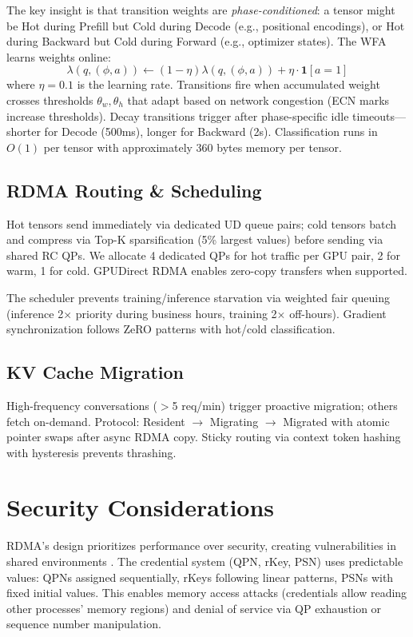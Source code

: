 \documentclass[10pt,letterpaper]{article}
\begin{document}
The key insight is that transition weights are \textit{phase-conditioned}: a tensor might be Hot during Prefill but Cold during Decode (e.g., positional encodings), or Hot during Backward but Cold during Forward (e.g., optimizer states). The WFA learns weights online:
\[
\lambda(q, (\phi, a)) \leftarrow (1-\eta)\lambda(q, (\phi, a)) + \eta \cdot \mathbf{1}[a = 1]
\]
where $\eta = 0.1$ is the learning rate. Transitions fire when accumulated weight crosses thresholds $\theta_w, \theta_h$ that adapt based on network congestion (ECN marks increase thresholds). Decay transitions trigger after phase-specific idle timeouts---shorter for Decode (500ms), longer for Backward (2s). Classification runs in $O(1)$ per tensor with approximately 360 bytes memory per tensor.

\subsection{RDMA Routing \& Scheduling}
Hot tensors send immediately via dedicated UD queue pairs; cold tensors batch and compress via Top-K sparsification (5\% largest values) before sending via shared RC QPs. We allocate 4 dedicated QPs for hot traffic per GPU pair, 2 for warm, 1 for cold. GPUDirect RDMA enables zero-copy transfers when supported.

The scheduler prevents training/inference starvation via weighted fair queuing (inference 2$\times$ priority during business hours, training 2$\times$ off-hours). Gradient synchronization follows ZeRO patterns with hot/cold classification.

\subsection{KV Cache Migration}
High-frequency conversations ($>$5 req/min) trigger proactive migration; others fetch on-demand. Protocol: Resident $\to$ Migrating $\to$ Migrated with atomic pointer swaps after async RDMA copy. Sticky routing via context token hashing with hysteresis prevents thrashing.

\section{Security Considerations}

RDMA's design prioritizes performance over security, creating vulnerabilities in shared environments \cite{bedrock, redmark}. The credential system (QPN, rKey, PSN) uses predictable values: QPNs assigned sequentially, rKeys following linear patterns, PSNs with fixed initial values. This enables memory access attacks (credentials allow reading other processes' memory regions) and denial of service via QP exhaustion or sequence number manipulation.
\end{document}
